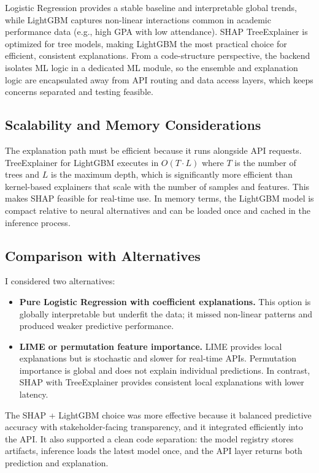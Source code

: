 \documentclass[12pt]{article}
\begin{document}
Logistic Regression provides a stable baseline and interpretable global trends, while LightGBM captures non-linear interactions common in academic performance data (e.g., high GPA with low attendance). SHAP TreeExplainer is optimized for tree models, making LightGBM the most practical choice for efficient, consistent explanations. From a code-structure perspective, the backend isolates ML logic in a dedicated ML module, so the ensemble and explanation logic are encapsulated away from API routing and data access layers, which keeps concerns separated and testing feasible.

\subsection{Scalability and Memory Considerations}
The explanation path must be efficient because it runs alongside API requests. TreeExplainer for LightGBM executes in $O(T\cdot L)$ where $T$ is the number of trees and $L$ is the maximum depth, which is significantly more efficient than kernel-based explainers that scale with the number of samples and features. This makes SHAP feasible for real-time use. In memory terms, the LightGBM model is compact relative to neural alternatives and can be loaded once and cached in the inference process.

\subsection{Comparison with Alternatives}
I considered two alternatives:
\begin{itemize}
  \item \textbf{Pure Logistic Regression with coefficient explanations.} This option is globally interpretable but underfit the data; it missed non-linear patterns and produced weaker predictive performance.
  \item \textbf{LIME or permutation feature importance.} LIME provides local explanations but is stochastic and slower for real-time APIs. Permutation importance is global and does not explain individual predictions. In contrast, SHAP with TreeExplainer provides consistent local explanations with lower latency.
\end{itemize}

The SHAP + LightGBM choice was more effective because it balanced predictive accuracy with stakeholder-facing transparency, and it integrated efficiently into the API. It also supported a clean code separation: the model registry stores artifacts, inference loads the latest model once, and the API layer returns both prediction and explanation.
\end{document}
